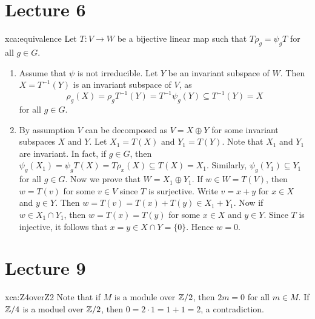 \section*{Lecture 6}

\begin{sol}{xca:equivalence}
Let $T\colon V\to W$ be a bijective linear map such that $T\rho_g=\psi_gT$ for all $g\in G$. 
\begin{enumerate}
	\item Assume that $\psi$ is not irreducible. Let $Y$ be an invariant subspace of $W$. 
		Then $X=T^{-1}(Y)$ is an invariant subspace of $V$, as 
		\[
		\rho_g(X)=\rho_gT^{-1}(Y)=T^{-1}\psi_g(Y)\subseteq T^{-1}(Y)=X
		\]
		for all $g\in G$. 
	\item By assumption
		$V$ can be decomposed as $V=X\oplus Y$ for some invariant subspaces $X$ and $Y$. Let $X_1=T(X)$ 
		and $Y_1=T(Y)$. 
		Note that $X_1$ and $Y_1$ are invariant. In fact, if $g\in G$, then  
		$\psi_g(X_1)=\psi_g T(X)=T\rho_x(X)\subseteq T(X)=X_1$.
		Similarly, $\psi_g(Y_1)\subseteq Y_1$ 
		for all $g\in G$. Now we prove that $W=X_1\oplus Y_1$. If $w\in W=T(V)$, then 
		$w=T(v)$ for some $v\in V$ since $T$ is surjective. Write $v=x+y$ for $x\in X$ and $y\in Y$. Then 
		$w=T(v)=T(x)+T(y)\in X_1+Y_1$. Now if $w\in X_1\cap Y_1$, then $w=T(x)=T(y)$ for some $x\in X$ and
		$y\in Y$. Since $T$ is injective, it follows that $x=y\in X\cap Y=\{0\}$. Hence $w=0$. 
	\end{enumerate}	
\end{sol}






\section*{Lecture 9}

\begin{sol}{xca:Z4overZ2}
	Note that if $M$ is a module over $\mathbb{Z}/2$, then $2m=0$ 
	for all $m\in M$.  If
	$\mathbb{Z}/4$ is a moduel over $\mathbb{Z}/2$, 
	then $0=2\cdot 1=1+1=2$, a contradiction. 
\end{sol}

